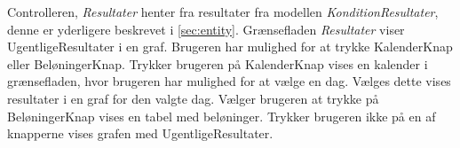 \noindent 
Controlleren, \textit{Resultater} henter fra resultater fra modellen \textit{KonditionResultater}, denne er yderligere beskrevet i \autoref{sec:entity}. Grænsefladen \textit{Resultater} viser UgentligeResultater i en graf. Brugeren har mulighed for at trykke KalenderKnap eller BeløningerKnap. Trykker brugeren på KalenderKnap vises en kalender i grænsefladen, hvor brugeren har mulighed for at vælge en dag. Vælges dette vises resultater i en graf for den valgte dag. Vælger brugeren at trykke på BeløningerKnap vises en tabel med beløninger. Trykker brugeren ikke på en af knapperne vises grafen med UgentligeResultater.  
 
